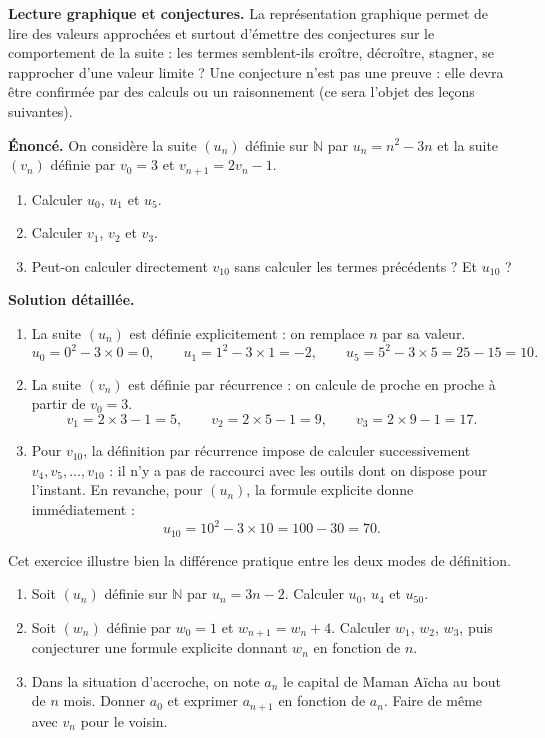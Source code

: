\documentclass[11pt]{article}
\newcommand{\cle}[1]{{\popxbold\color{popdark}#1}}
\begin{document}
\textbf{Lecture graphique et conjectures.} La représentation graphique permet de lire des valeurs approchées et surtout d'émettre des \cle{conjectures} sur le comportement de la suite : les termes semblent-ils croître, décroître, stagner, se rapprocher d'une valeur limite ? Une conjecture n'est pas une preuve : elle devra être confirmée par des calculs ou un raisonnement (ce sera l'objet des leçons suivantes).

\begin{exoresolu}
\textbf{Énoncé.} On considère la suite $(u_n)$ définie sur $\mathbb{N}$ par $u_n = n^2 - 3n$ et la suite $(v_n)$ définie par $v_0 = 3$ et $v_{n+1} = 2v_n - 1$.
\begin{enumerate}
\item Calculer $u_0$, $u_1$ et $u_5$.
\item Calculer $v_1$, $v_2$ et $v_3$.
\item Peut-on calculer directement $v_{10}$ sans calculer les termes précédents ? Et $u_{10}$ ?
\end{enumerate}
\tcblower
\textbf{Solution détaillée.}
\begin{enumerate}
\item La suite $(u_n)$ est définie explicitement : on remplace $n$ par sa valeur.
\[ u_0 = 0^2 - 3 \times 0 = 0, \qquad u_1 = 1^2 - 3 \times 1 = -2, \qquad u_5 = 5^2 - 3 \times 5 = 25 - 15 = 10. \]
\item La suite $(v_n)$ est définie par récurrence : on calcule de proche en proche à partir de $v_0 = 3$.
\[ v_1 = 2 \times 3 - 1 = 5, \qquad v_2 = 2 \times 5 - 1 = 9, \qquad v_3 = 2 \times 9 - 1 = 17. \]
\item Pour $v_{10}$, la définition par récurrence impose de calculer successivement $v_4, v_5, \dots, v_{10}$ : il n'y a pas de raccourci avec les outils dont on dispose pour l'instant. En revanche, pour $(u_n)$, la formule explicite donne immédiatement :
\[ u_{10} = 10^2 - 3 \times 10 = 100 - 30 = 70. \]
\end{enumerate}
Cet exercice illustre bien la différence pratique entre les deux modes de définition.
\end{exoresolu}

\begin{exercice}
\begin{enumerate}
\item Soit $(u_n)$ définie sur $\mathbb{N}$ par $u_n = 3n - 2$. Calculer $u_0$, $u_4$ et $u_{50}$.
\item Soit $(w_n)$ définie par $w_0 = 1$ et $w_{n+1} = w_n + 4$. Calculer $w_1$, $w_2$, $w_3$, puis conjecturer une formule explicite donnant $w_n$ en fonction de $n$.
\item Dans la situation d'accroche, on note $a_n$ le capital de Maman Aïcha au bout de $n$ mois. Donner $a_0$ et exprimer $a_{n+1}$ en fonction de $a_n$. Faire de même avec $v_n$ pour le voisin.
\end{enumerate}
\end{exercice}
\end{document}
